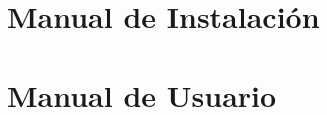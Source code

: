 \documentclass[12pt, a4paper, twoside]{article}
\begin{document}
\nocite{*}
\printbibliography


\newpage

\begin{umaappendices}
  \section{Manual de Instalación}
  \section{Manual de Usuario}

\end{umaappendices}


\end{document}
